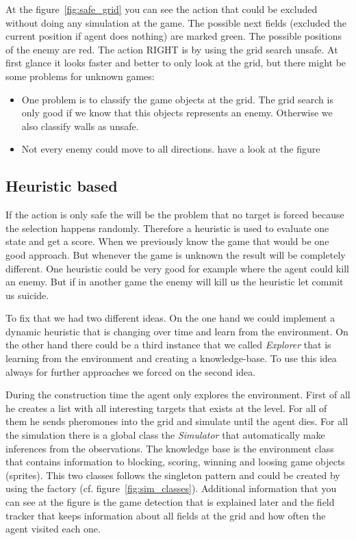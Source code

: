 At the figure~\ref{fig:safe_grid} you can see the action that could be excluded without doing any simulation at the game.
The possible next fields (excluded the current position if agent does nothing) are marked green. The possible positions
of the enemy are red. The action RIGHT is by using the grid search unsafe. 
At first glance it looks faster and better to only look at the grid, but there might be some problems for unknown games:

\begin{itemize}
  \item One problem is to classify the game objects at the grid. The grid search is only good if we know that this objects represents an enemy. Otherwise
  we also classify walls as unsafe.
  \item Not every enemy could move to all directions. have a look at the figure 
\end{itemize}



\subsection{Heuristic based} 
 
If the action is only safe the will be the problem that no target is forced because the selection happens randomly.
Therefore a heuristic is used to evaluate one state and get a score. When we previously know the game
that would be one good approach. But whenever the game is unknown the result will be completely different.
One heuristic could be very good for example where the agent could kill an enemy. But if in another game
the enemy will kill us the heuristic let commit us suicide.

To fix that we had two different ideas. On the one hand we could implement a dynamic heuristic that is changing over time
and learn from the environment. On the other hand there could be a third instance that we called \textit{Explorer} 
that is learning from the environment and creating a knowledge-base. 
To use this idea always for further approaches we forced on the second idea.

During the construction time the agent only explores the environment. 
First of all he creates a list with all interesting targets that exists at the level. For all of them he sends pheromones into the grid
and simulate until the agent dies. 
For all the simulation there is a global class the \textit{Simulator} that automatically make inferences from the observations.
The knowledge base is the environment class that contains information to blocking, scoring, winning and loosing game objects (sprites).
This two classes follows the singleton pattern and could be created by using the factory (cf. figure~\ref{fig:sim_classes}).
Additional information that you can see at the figure is the game detection that is explained later and the field tracker that keeps 
information about all fields at the grid and how often the agent visited each one.

